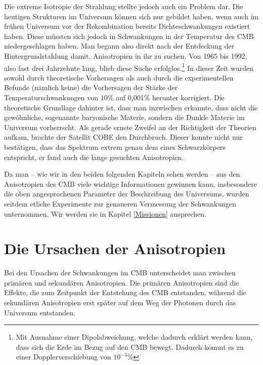 \documentclass[10pt,a4paper]{article}
\begin{document}
Die extreme Isotropie der Strahlung stellte jedoch auch ein Problem dar. Die heutigen Strukturen im Universum können sich nur gebildet haben, wenn auch im frühen Universum vor der Rekombination bereits Dichteschwankungen existiert haben. Diese müssten sich jedoch in Schwankungen in der Temperatur des CMB niedergeschlagen haben. Man begann also direkt nach der Entdeckung der Hintergrundstahlung damit, Anisotropien in ihr zu suchen. Von 1965 bis 1992, also fast drei Jahrzehnte lang, blieb diese Suche erfolglos.\footnote{Mit Ausnahme einer Dipolabweichung, welche dadurch erklärt werden kann, dass sich die Erde im Bezug auf den CMB bewegt. Dadurch kommt es zu einer Dopplerverschiebung von $10^{-3}$\%} %
In dieser Zeit wurden sowohl durch theoretische Vorhersagen als auch durch die experimentellen Befunde (nämlich keine) die Vorhersagen der Stärke der Temperaturschwankungen von 10\% auf 0,001\%  herunter korrigiert.
Die theoretische Grundlage dahinter ist, dass man inzwischen erkannte, dass nicht die gewöhnliche, sogenannte baryonische Materie, sondern die Dunkle Materie im Universum vorherrscht.
Als gerade ernste Zweifel an der Richtigkeit der Theorien aufkam, brachte der Satellit COBE den Durchbruch. Dieser konnte nicht nur bestätigen, dass das Spektrum extrem genau dem eines Schwarzkörpers entspricht, %
er fand auch die lange gesuchten Anisotropien.

Da man -- wie wir in den beiden folgenden Kapiteln sehen werden -- aus den Anisotropien des CMB viele wichtige Informationen gewinnen kann, insbesondere die oben angesprochenen Parameter der Beschreibung des Universums, wurden seitdem etliche Experimente zur genaueren Vermessung der Schwankungen unternommen. Wir werden sie in Kapitel \ref{Missionen} ansprechen.

\section{Die Ursachen der Anisotropien}
Bei den Ursachen der Schwankungen im CMB unterscheidet man zwischen primären und sekundären Anisotropien. Die primären Anisotropien sind die Effekte, die zum Zeitpunkt der Entstehung des CMB entstanden, während die sekundären Anisotropien erst später auf dem Weg der Photonen durch das Universum entstanden.
\end{document}
